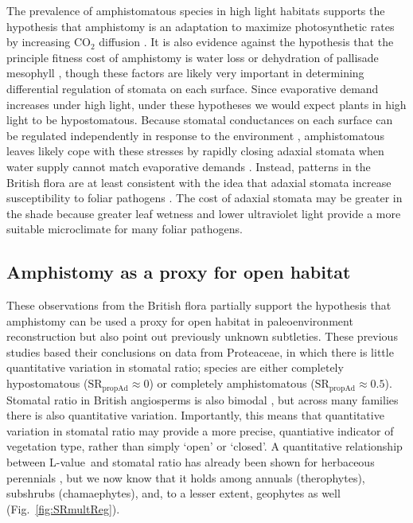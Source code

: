 \documentclass[12pt, oneside]{article}
\newcommand{\el}{L-value}
\begin{document}
The prevalence of amphistomatous species in high light habitats supports the hypothesis that amphistomy is an adaptation to maximize photosynthetic rates by increasing CO$_2$ diffusion \citep{Jones_1985}. It is also evidence against the hypothesis that the principle fitness cost of amphistomy is water loss \citep{Darwin_1886, Foster_Smith_1986} or dehydration of pallisade mesophyll \citep{Buckley_etal_2015}, though these factors are likely very important in determining differential regulation of stomata on each surface. Since evaporative demand increases under high light, under these hypotheses we would expect plants in high light to be hypostomatous. Because stomatal conductances on each surface can be regulated independently in response to the environment \citep{Darwin_1898, Pospisilova_Solarova_1980, Smith_1981, Reich_1984, Mott_Oleary_1984}, amphistomatous leaves likely cope with these stresses by rapidly closing adaxial stomata when water supply cannot match evaporative demands \citep{Richardson_etal_2017}. Instead, patterns in the British flora are at least consistent with the idea that adaxial stomata increase susceptibility to foliar pathogens \citep{Gutschick_1984b, Mckown_etal_2014}. The cost of adaxial stomata may be greater in the shade because greater leaf wetness and lower ultraviolet light provide a more suitable microclimate for many foliar pathogens.

\subsection*{Amphistomy as a proxy for open habitat}

These observations from the British flora partially support the hypothesis that amphistomy can be used a proxy for open habitat in paleoenvironment reconstruction \citep{Carpenter_1994, Jordan_etal_2014, Carpenter_etal_2015} but also point out previously unknown subtleties. These previous studies based their conclusions on data from Proteaceae, in which there is little quantitative variation in stomatal ratio; species are either completely hypostomatous ($\mathrm{SR_{propAd}} \approx 0$) or completely amphistomatous ($\mathrm{SR_{propAd}} \approx 0.5$). Stomatal ratio in British angiosperms is also bimodal \citep{Peat_Fitter_1994b}, but across many families there is also quantitative variation. Importantly, this means that quantitative variation in stomatal ratio may provide a more precise, quantiative indicator of vegetation type, rather than simply `open' or `closed'. A quantitative relationship between \el~and stomatal ratio has already been shown for herbaceous perennials \citep{Bucher_etal_2017}, but we now know that it holds among annuals (therophytes), subshrubs (chamaephytes), and, to a lesser extent, geophytes as well (Fig.~\ref{fig:SRmultReg}). 
\end{document}
